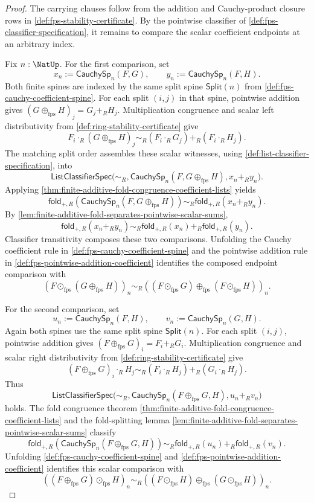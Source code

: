 \begin{proof}
The carrying clauses follow from the addition and Cauchy-product closure rows in \autoref{def:fps-stability-certificate}. By the pointwise classifier of \autoref{def:fps-classifier-specification}, it remains to compare the scalar coefficient endpoints at an arbitrary index.

Fix $n:\NatUp$. For the first comparison, set
$$
x_n:=\mathsf{CauchySp}_n(F,G),
\qquad
y_n:=\mathsf{CauchySp}_n(F,H).
$$
Both finite spines are indexed by the same split spine $\mathsf{Split}(n)$ from \autoref{def:fps-cauchy-coefficient-spine}. For each split $(i,j)$ in that spine, pointwise addition gives $(G\oplus_{\mathrm{fps}}H)_j=G_j+_RH_j$. Multiplication congruence and scalar left distributivity from \autoref{def:ring-stability-certificate} give
$$
F_i\cdot_R(G\oplus_{\mathrm{fps}}H)_j
\sim_R
(F_i\cdot_RG_j)+_R(F_i\cdot_RH_j).
$$
The matching split order assembles these scalar witnesses, using \autoref{def:list-classifier-specification}, into
$$
\mathsf{ListClassifierSpec}\bigl(\sim_R,
\mathsf{CauchySp}_n(F,G\oplus_{\mathrm{fps}}H),x_n+_Ry_n\bigr).
$$
Applying \autoref{thm:finite-additive-fold-congruence-coefficient-lists} yields
$$
\mathsf{fold}_{+,R}(\mathsf{CauchySp}_n(F,G\oplus_{\mathrm{fps}}H))
\sim_R
\mathsf{fold}_{+,R}(x_n+_Ry_n).
$$
By \autoref{lem:finite-additive-fold-separates-pointwise-scalar-sums},
$$
\mathsf{fold}_{+,R}(x_n+_Ry_n)
\sim_R
\mathsf{fold}_{+,R}(x_n)+_R\mathsf{fold}_{+,R}(y_n).
$$
Classifier transitivity composes these two comparisons. Unfolding the Cauchy coefficient rule in \autoref{def:fps-cauchy-coefficient-spine} and the pointwise addition rule in \autoref{def:fps-pointwise-addition-coefficient} identifies the composed endpoint comparison with
$$
(F\odot_{\mathrm{fps}}(G\oplus_{\mathrm{fps}}H))_n
\sim_R
((F\odot_{\mathrm{fps}}G)\oplus_{\mathrm{fps}}(F\odot_{\mathrm{fps}}H))_n.
$$

For the second comparison, set
$$
u_n:=\mathsf{CauchySp}_n(F,H),
\qquad
v_n:=\mathsf{CauchySp}_n(G,H).
$$
Again both spines use the same split spine $\mathsf{Split}(n)$. For each split $(i,j)$, pointwise addition gives $(F\oplus_{\mathrm{fps}}G)_i=F_i+_RG_i$. Multiplication congruence and scalar right distributivity from \autoref{def:ring-stability-certificate} give
$$
(F\oplus_{\mathrm{fps}}G)_i\cdot_RH_j
\sim_R
(F_i\cdot_RH_j)+_R(G_i\cdot_RH_j).
$$
Thus
$$
\mathsf{ListClassifierSpec}\bigl(\sim_R,
\mathsf{CauchySp}_n(F\oplus_{\mathrm{fps}}G,H),u_n+_Rv_n\bigr)
$$
holds. The fold congruence theorem \autoref{thm:finite-additive-fold-congruence-coefficient-lists} and the fold-splitting lemma \autoref{lem:finite-additive-fold-separates-pointwise-scalar-sums} classify
$$
\mathsf{fold}_{+,R}(\mathsf{CauchySp}_n(F\oplus_{\mathrm{fps}}G,H))
\sim_R
\mathsf{fold}_{+,R}(u_n)+_R\mathsf{fold}_{+,R}(v_n).
$$
Unfolding \autoref{def:fps-cauchy-coefficient-spine} and \autoref{def:fps-pointwise-addition-coefficient} identifies this scalar comparison with
$$
((F\oplus_{\mathrm{fps}}G)\odot_{\mathrm{fps}}H)_n
\sim_R
((F\odot_{\mathrm{fps}}H)\oplus_{\mathrm{fps}}(G\odot_{\mathrm{fps}}H))_n.
$$


\end{proof}
